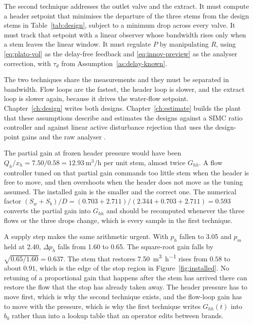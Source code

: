 The second technique addresses the outlet valve and the extract. It must compute a header setpoint that minimises the departure of the three stems from the design stems in Table~\ref{tab:design}, subject to a minimum drop across every valve. It must track that setpoint with a linear observer whose bandwidth rises only when a stem leaves the linear window. It must regulate $P$ by manipulating $R$, using \eqref{eq:plato-vol} as the delay-free feedback and \eqref{eq:innov-preview} as the analyser correction, with $\tau_d$ from Assumption~\ref{as:delay-known}.

The two techniques share the measurements and they must be separated in bandwidth. Flow loops are the fastest, the header loop is slower, and the extract loop is slower again, because it drives the water-flow setpoint. Chapter~\ref{ch:design} writes both designs. Chapter~\ref{ch:estimate} builds the plant that these assumptions describe and estimates the designs against a SIMC ratio controller \cite{skogestad2003simc,shinskey1996process} and against linear active disturbance rejection that uses the design-point gains and the raw analyser \cite{gao2003scaling,zhao2014delay}.

The partial gain at frozen header pressure would have been $Q_h/x_h = 7.50/0.58 = 12.93\ \si{\cubic\metre\per\hour}$ per unit stem, almost twice $G_{hh}$. A flow controller tuned on that partial gain commands too little stem when the header is free to move, and then overshoots when the header does not move as the tuning assumed. The installed gain is the smaller and the correct one. The numerical factor $(S_w+S_b)/D = (0.703+2.711)/(2.344+0.703+2.711) = 0.593$ converts the partial gain into $G_{hh}$ and should be recomputed whenever the three flows or the three drops change, which is every sample in the first technique.

A supply step makes the same arithmetic urgent. With $p_h$ fallen to \SI{3.05}{\barg} and $p_m$ held at \SI{2.40}{\barg}, $\Delta p_h$ falls from \SI{1.60}{\barg} to \SI{0.65}{\barg}. The square-root gain falls by $\sqrt{0.65/1.60}=0.637$. The stem that restores \SI{7.50}{\cubic\metre\per\hour} rises from $0.58$ to about $0.91$, which is the edge of the stop region in Figure~\ref{fig:installed}. No retuning of a proportional gain that happens after the stem has arrived there can restore the flow that the stop has already taken away. The header pressure has to move first, which is why the second technique exists, and the flow-loop gain has to move with the pressure, which is why the first technique writes $G_{hh}(t)$ into $b_0$ rather than into a lookup table that an operator edits between brands.

